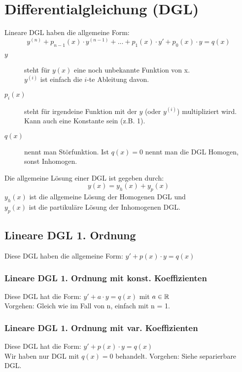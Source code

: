 \section{Differentialgleichung (DGL)}
Lineare DGL haben die allgemeine Form:
\[
	y^{(n)} + p_{n-1}(x) \cdot y^{(n-1)} + ... + p_1(x) \cdot y' + p_0(x) \cdot y = q(x) 
\]

\begin{description}
	\item [$y$] steht für $y(x)$ eine noch unbekannte Funktion von x.\\
			$y^{(i)}$ ist einfach die $i$-te Ableitung davon.

	\item [$p_i(x)$] steht für irgendeine Funktion mit der $y$ (oder $y^{(i)}$) multipliziert wird. Kann auch eine Konstante sein (z.B. 1).

	\item [$q(x)$] nennt man Störfunktion. Ist $q(x) = 0$ nennt man die DGL Homogen, sonst Inhomogen.
\end{description}

Die allgemeine Lösung einer DGL ist gegeben durch:
\[
	y(x) = y_h(x) + y_p(x)
\]
$y_h(x)$ ist die allgemeine Lösung der Homogenen DGL und\\
$y_p(x)$ ist die partikuläre Lösung der Inhomogenen DGL.

\subsection{Lineare DGL 1. Ordnung}
Diese DGL haben die allgemeine Form: $y' + p(x) \cdot y = q(x)$

\subsubsection{Lineare DGL 1. Ordnung mit konst. Koeffizienten}
Diese DGL hat die Form: $y' + a \cdot y = q(x)$ mit $a \in \mathbb{R}$\\

Vorgehen: Gleich wie im Fall von n, einfach mit n = 1.

\subsubsection{Lineare DGL 1. Ordnung mit var. Koeffizienten}
Diese DGL hat die Form: $y' + p(x) \cdot y = q(x)$\\

Wir haben nur DGL mit $q(x) = 0$ behandelt.
Vorgehen: Siehe separierbare DGL.

